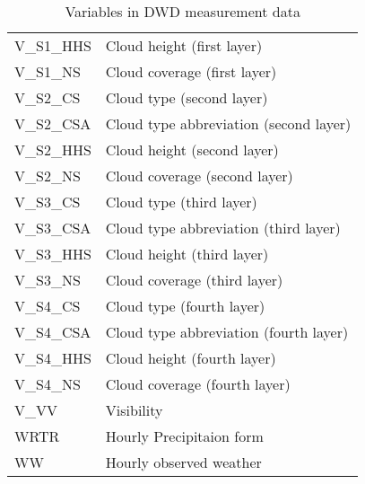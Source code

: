 \documentclass[class=scrbook, crop=false]{standalone}
\begin{document}
\begin{table}[]
\begin{tabular}{l|l}
   V\_S1\_HHS	& Cloud height (first layer) \\
   V\_S1\_NS	 & Cloud coverage (first layer) \\
   V\_S2\_CS & Cloud type (second layer) \\
   V\_S2\_CSA & Cloud type abbreviation (second layer) \\
   V\_S2\_HHS	& Cloud height (second layer) \\
   V\_S2\_NS	 & Cloud coverage (second layer) \\
   V\_S3\_CS & Cloud type (third layer) \\
   V\_S3\_CSA & Cloud type abbreviation (third layer) \\
   V\_S3\_HHS	& Cloud height (third layer) \\
   V\_S3\_NS	 & Cloud coverage (third layer) \\
   V\_S4\_CS & Cloud type (fourth layer) \\
   V\_S4\_CSA & Cloud type abbreviation (fourth layer) \\
   V\_S4\_HHS	& Cloud height (fourth layer) \\
   V\_S4\_NS	 & Cloud coverage (fourth layer) \\
   V\_VV	& Visibility\\
  
   WRTR & Hourly Precipitaion form \\
   WW & Hourly observed weather \\ 
   
\end{tabular}
\caption{Variables in DWD measurement data}
\label{Table::DWD_Measurement_Parameters}
\end{table}
\end{document}
